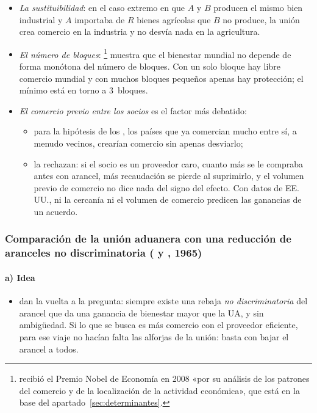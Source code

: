 \documentclass[11pt]{article}
\begin{document}
\begin{itemize}
\item \emph{La sustituibilidad}: en el caso extremo en que $A$ y $B$ producen el mismo bien industrial y $A$ importaba de $R$ bienes agrícolas que $B$ no produce, la unión crea comercio en la industria y no desvía nada en la agricultura.
\item \emph{El número de bloques}: \textcite{Krugman1991Bilateralism}\footnote{ recibió el Premio Nobel de Economía en 2008 «por su análisis de los patrones del comercio y de la localización de la actividad económica»\nocite{Nobel2008Krugman}, que está en la base del apartado~\ref{sec:determinantes}.} muestra que el bienestar mundial no depende de forma monótona del número de bloques. Con un solo bloque hay libre comercio mundial y con muchos bloques pequeños apenas hay protección; el mínimo está en torno a 3~bloques.
\item \emph{El comercio previo entre los socios} es el factor más debatido:
  \begin{itemize}
  \item para la hipótesis de los , los países que ya comercian mucho entre sí, a menudo vecinos, crearían comercio sin apenas desviarlo\nocite{WonnacottLutz1989,Krugman1991Move,Summers1991};
  \item \textcite{BhagwatiPanagariya1996} la rechazan: si el socio es un proveedor caro, cuanto más se le compraba antes con arancel, más recaudación se pierde al suprimirlo, y el volumen previo de comercio no dice nada del signo del efecto. Con datos de EE.\,UU., ni la cercanía ni el volumen de comercio predicen las ganancias de un acuerdo\nocite{Krishna2003}.
  \end{itemize}
\end{itemize}

\subsubsection{Comparación de la unión aduanera con una reducción de aranceles no discriminatoria ( y , 1965)}\label{sec:cooper-massell}

\paragraph{a) Idea}

\begin{itemize}
\item \textcite{CooperMassell1965New} dan la vuelta a la pregunta: siempre existe una rebaja \emph{no discriminatoria} del arancel que da una ganancia de bienestar mayor que la UA, y sin ambigüedad. Si lo que se busca es más comercio con el proveedor eficiente, para ese viaje no hacían falta las alforjas de la unión: basta con bajar el arancel a todos.
\end{itemize}
\end{document}
